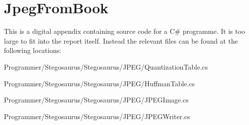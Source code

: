 \chapter{JpegFromBook}
\label{app:B}
This is a digital appendix containing source code for a C\# programme. It is too large to fit into the report itself.
Instead the relevant files can be found at the following locations:

Programmer/Stegosaurus/Stegosaurus/JPEG/QuantizationTable.cs

Programmer/Stegosaurus/Stegosaurus/JPEG/HuffmanTable.cs

Programmer/Stegosaurus/Stegosaurus/JPEG/JPEGImage.cs

Programmer/Stegosaurus/Stegosaurus/JPEG/JPEGWriter.cs

%
%
%
%
